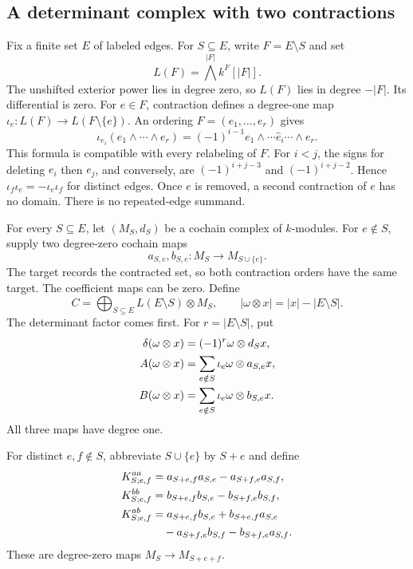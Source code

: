 \subsection{A determinant complex with two contractions}
\label{subsec:determinant-complex}

Fix a finite set $E$ of labeled edges.
For $S\subseteq E$, write $F=E\setminus S$ and set
\[
L(F)=\bigwedge^{|F|}k^F[|F|].
\]
The unshifted exterior power lies in degree zero, so $L(F)$ lies in degree $-|F|$.
Its differential is zero.
For $e\in F$, contraction defines a degree-one map
$\iota_e:L(F)\longrightarrow L(F\setminus\{e\})$.
An ordering $F=(e_1,\ldots,e_r)$ gives
\begin{equation}
\label{eq:ordered-deletion}
\iota_{e_i}(e_1\wedge\cdots\wedge e_r)
=(-1)^{i-1}e_1\wedge\cdots\widehat e_i\cdots\wedge e_r.
\end{equation}
This formula is compatible with every relabeling of $F$.
For $i<j$, the signs for deleting $e_i$ then $e_j$, and conversely, are
$(-1)^{i+j-3}$ and $(-1)^{i+j-2}$.
Hence $\iota_f\iota_e=-\iota_e\iota_f$ for distinct edges.
Once $e$ is removed, a second contraction of $e$ has no domain.
There is no repeated-edge summand.

For every $S\subseteq E$, let $(M_S,d_S)$ be a cochain complex of $k$-modules.
For $e\notin S$, supply two degree-zero cochain maps
\[
a_{S,e},b_{S,e}:M_S\longrightarrow M_{S\cup\{e\}}.
\]
The target records the contracted set, so both contraction orders have the same target.
The coefficient maps can be zero.
Define
\[
C=\bigoplus_{S\subseteq E} L(E\setminus S)\otimes M_S,
\qquad |\omega\otimes x|=|x|-|E\setminus S|.
\]
The determinant factor comes first.
For $r=|E\setminus S|$, put
\begin{align}
\label{eq:total-contractions}
\delta(\omega\otimes x)&=(-1)^r\omega\otimes d_Sx,\notag\\
A(\omega\otimes x)&=\sum_{e\notin S}\iota_e\omega\otimes a_{S,e}x,\\
B(\omega\otimes x)&=\sum_{e\notin S}\iota_e\omega\otimes b_{S,e}x.\notag
\end{align}
All three maps have degree one.

For distinct $e,f\notin S$, abbreviate $S\cup\{e\}$ by $S+e$ and define
\begin{align}
\label{eq:coefficient-defects}
K^{aa}_{S;e,f}
 &=a_{S+e,f}a_{S,e}-a_{S+f,e}a_{S,f},\notag\\
K^{bb}_{S;e,f}
 &=b_{S+e,f}b_{S,e}-b_{S+f,e}b_{S,f},\\
K^{ab}_{S;e,f}
 &=a_{S+e,f}b_{S,e}+b_{S+e,f}a_{S,e}\notag\\
 &\quad-a_{S+f,e}b_{S,f}-b_{S+f,e}a_{S,f}.\notag
\end{align}
These are degree-zero maps $M_S\to M_{S+e+f}$.

